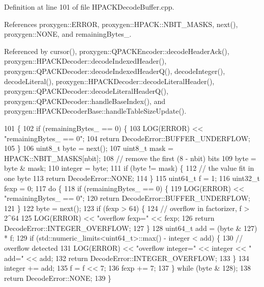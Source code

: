 Definition at line 101 of file H\+P\+A\+C\+K\+Decode\+Buffer.\+cpp.



References proxygen\+::\+E\+R\+R\+OR, proxygen\+::\+H\+P\+A\+C\+K\+::\+N\+B\+I\+T\+\_\+\+M\+A\+S\+KS, next(), proxygen\+::\+N\+O\+NE, and remaining\+Bytes\+\_\+.



Referenced by cursor(), proxygen\+::\+Q\+P\+A\+C\+K\+Encoder\+::decode\+Header\+Ack(), proxygen\+::\+H\+P\+A\+C\+K\+Decoder\+::decode\+Indexed\+Header(), proxygen\+::\+Q\+P\+A\+C\+K\+Decoder\+::decode\+Indexed\+Header\+Q(), decode\+Integer(), decode\+Literal(), proxygen\+::\+H\+P\+A\+C\+K\+Decoder\+::decode\+Literal\+Header(), proxygen\+::\+Q\+P\+A\+C\+K\+Decoder\+::decode\+Literal\+Header\+Q(), proxygen\+::\+Q\+P\+A\+C\+K\+Decoder\+::handle\+Base\+Index(), and proxygen\+::\+H\+P\+A\+C\+K\+Decoder\+Base\+::handle\+Table\+Size\+Update().


\begin{DoxyCode}
101                                                                             \{
102   \textcolor{keywordflow}{if} (remainingBytes_ == 0) \{
103     LOG(ERROR) << \textcolor{stringliteral}{"remainingBytes\_ == 0"};
104     \textcolor{keywordflow}{return} DecodeError::BUFFER\_UNDERFLOW;
105   \}
106   uint8\_t byte = next();
107   uint8\_t mask = HPACK::NBIT_MASKS[nbit];
108   \textcolor{comment}{// remove the first (8 - nbit) bits}
109   byte = byte & mask;
110   integer = byte;
111   \textcolor{keywordflow}{if} (byte != mask) \{
112     \textcolor{comment}{// the value fit in one byte}
113     \textcolor{keywordflow}{return} DecodeError::NONE;
114   \}
115   uint64\_t f = 1;
116   uint32\_t fexp = 0;
117   \textcolor{keywordflow}{do} \{
118     \textcolor{keywordflow}{if} (remainingBytes_ == 0) \{
119       LOG(ERROR) << \textcolor{stringliteral}{"remainingBytes\_ == 0"};
120       \textcolor{keywordflow}{return} DecodeError::BUFFER\_UNDERFLOW;
121     \}
122     byte = next();
123     \textcolor{keywordflow}{if} (fexp > 64) \{
124       \textcolor{comment}{// overflow in factorizer, f > 2^64}
125       LOG(ERROR) << \textcolor{stringliteral}{"overflow fexp="} << fexp;
126       \textcolor{keywordflow}{return} DecodeError::INTEGER\_OVERFLOW;
127     \}
128     uint64\_t add = (byte & 127) * f;
129     \textcolor{keywordflow}{if} (std::numeric\_limits<uint64\_t>::max() - integer < add) \{
130       \textcolor{comment}{// overflow detected}
131       LOG(ERROR) << \textcolor{stringliteral}{"overflow integer="} << integer << \textcolor{stringliteral}{" add="} << add;
132       \textcolor{keywordflow}{return} DecodeError::INTEGER\_OVERFLOW;
133     \}
134     integer += add;
135     f = f << 7;
136     fexp += 7;
137   \} \textcolor{keywordflow}{while} (byte & 128);
138   \textcolor{keywordflow}{return} DecodeError::NONE;
139 \}
\end{DoxyCode}

